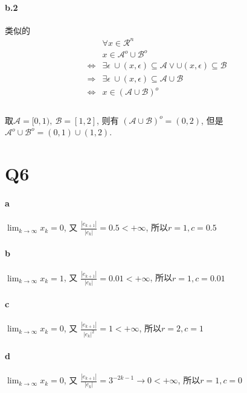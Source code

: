 \documentclass{article}
\begin{document}
\begin{CJK}{UTF8}{gbsn}
  \paragraph{b.2}
    类似的
    \begin{equation}
      \begin{aligned}
        & \forall x \in \mathcal{R}^n \\
        & x \in \mathcal{A}^o \cup \mathcal{B}^o \\
        \iff & \exists \epsilon \ \cup (x, \epsilon) \subseteq \mathcal{A} \lor \cup (x, \epsilon) \subseteq \mathcal{B} \\
        \Longrightarrow & \exists \epsilon \ \cup (x, \epsilon) \subseteq \mathcal{A} \cup \mathcal{B} \\
        \iff & x \in (\mathcal{A} \cup \mathcal{B})^o \\
      \end{aligned}
    \end{equation}
    \paragraph{}
      取$\mathcal{A} = [0, 1),\ \mathcal{B} = [1, 2]$, 则有 $(\mathcal{A} \cup \mathcal{B})^o = (0, 2)$, 但是 $\mathcal{A}^o \cup \mathcal{B}^o = (0, 1) \cup (1, 2)$.
\section{Q6}
  \paragraph{a}
    $\lim_{k \to \infty} x_k = 0$, 又 $\frac{|e_{k + 1}|}{|e_k|} = 0.5 < +\infty$, 所以$r = 1, c = 0.5$
  \paragraph{b}
    $\lim_{k \to \infty} x_k = 1$, 又 $\frac{|e_{k + 1}|}{|e_k|} = 0.01 < +\infty$, 所以$r = 1, c = 0.01$
  \paragraph{c}
    $\lim_{k \to \infty} x_k = 0$, 又 $\frac{|e_{k + 1}|}{|e_k|^2} = 1 < +\infty$, 所以$r = 2, c = 1$
  \paragraph{d}
    $\lim_{k \to \infty} x_k = 0$, 又 $\frac{|e_{k + 1}|}{|e_k|} = 3^{-2k - 1} \to 0 < +\infty$, 所以$r = 1, c = 0$

\end{CJK}
\end{document}
